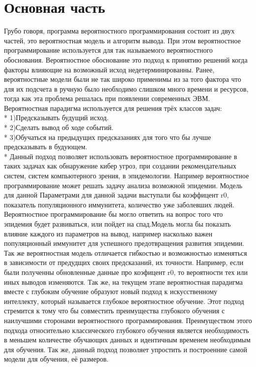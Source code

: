 \documentclass{article}
\begin{document}
\section{Основная часть}
Грубо говоря, программа вероятностного программирования состоит из двух частей, это вероятностная модель и алгоритм вывода. При этом вероятностное программирование используется для так называемого вероятностного обоснования. Вероятностное обоснование это подход к принятию решений когда факторы влияющие на возможный исход недетерминированны. Ранее, вероятностные модели были не так широко применимы из за того фактора что для их подсчета в ручную было необходимо слишком много времени и ресурсов, тогда как эта проблема решалась при появлении современных ЭВМ. Вероятностная парадигма используется для решения трёх классов задач:
\\*
1)Предсказывать будущий исход.
\\*
2)Сделать вывод об ходе событий.
\\*
3)Обучаться на предыдущих предсказаниях для того что бы лучше предсказывать в будующем.
\\*
Данный подход позволяет использовать вероятностное программирование в таких задачах как обнаружение кибер угроз, при создании рекомендательных систем, систем компьютерного зрения, в эпидемологии. 
Например вероятностное программирование может решать задачу анализа возможной эпидемии. Модель для данной Параметрами для данной задачи выступали бы коэффицент r0, показатель популяционного иммунитета, количество уже заболевших людей. Вероятностное программирование бы могло ответить на вопрос того что эпидемия будет развиваться, или пойдет на спад.Модель могла бы показать влияние каждого из параметров на вывод, например насколько важен популяционный иммунитет для успешного предотвращения развития эпидемии. Так же вероятностная модель отличается гибкостью и возможностью изменяться в зависимости от предудщих своих предсказаний, их точности. Например, если были полученны обновленные данные про коэфицент r0, то вероятности тех или иных выводов изменяются.
Так же, на текущем этапе вероятностная парадигма вместе с глубоким обучение образуют новый подход к искусственному интеллекту, который называется глубокое вероятностное обучение. Этот подход стремится к тому что бы совместить преимущества глубокого обучения с наилучшими сторонами вероятностного программирования. Преимуществом этого подхода относительно классического глубокого обучения является необходимость в меньшем количестве обучающих данных и идентичным временем необходимым для обучения. Так же, данный подход позволяет упростить и построенние самой модели для обучения, её размеров.
\end{document}
